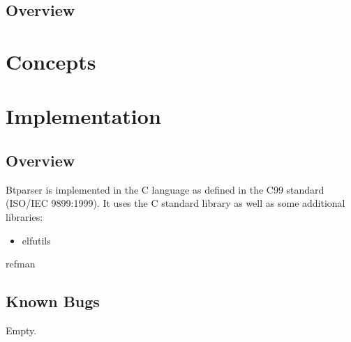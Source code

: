 \documentclass[a4paper]{book}
\title{Btparser\\
\vskip 1em
\large{A program failure analysis library}}
\author{Karel Klíč}
\begin{document}
\maketitle

\tableofcontents

\cleardoublepage

\chapter{Overview}

\part{Concepts}

\part{Implementation}

\chapter{Overview}

Btparser is implemented in the C language as defined in the C99
standard (ISO/IEC 9899:1999).  It uses the C standard library as well
as some additional libraries:
\begin{itemize}
\item elfutils
\end{itemize}

{refman}

\chapter{Known Bugs}
Empty.

\clearpage
{}
\printindex
\end{document}
